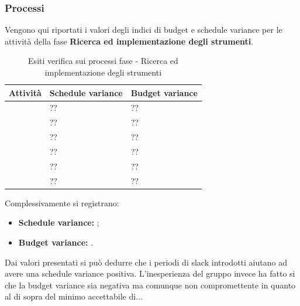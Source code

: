 		\subsubsection{Processi}
		Vengono qui riportati i valori degli indici di budget e schedule variance per le attività della fase \textbf{Ricerca ed implementazione degli strumenti}.
			\begin{table}[!ht]
			\begin{center}
				\begin{tabularx}{0.9\textwidth}{|l|l|X|}
					\hline
					\textbf{Attività} & \textbf{Schedule variance} & \textbf{Budget variance}\\
					\hline						
					\docNameVersionAdR & ?? & ??\\
					\hline
					\docNameVersionGlo & ?? & ??\\
					\hline					
					\docNameVersionNdP & ?? & ??\\
					\hline					
					\docNameVersionPdP & ?? & ??\\
					\hline					
					\docNameVersionPdQ & ?? & ??\\
					\hline					
					\docNameVersionSdF & ?? & ??\\
					\hline				
				\end{tabularx}
			\end{center}
		\caption{Esiti verifica sui processi fase - Ricerca ed implementazione degli strumenti}
	\end{table}
	Complessivamente si registrano:
	\begin{itemize}
	\item \textbf{Schedule variance:} ;
	\item \textbf{Budget variance:} .
	\end{itemize}
	Dai valori presentati si può dedurre che i periodi di slack introdotti aiutano ad avere una schedule variance positiva. L'inesperienza del gruppo invece ha fatto si che la budget variance sia negativa ma comunque non compromettente in quanto al di sopra del minimo accettabile di...



